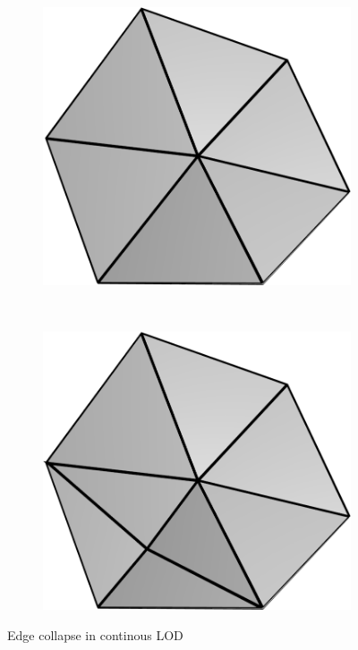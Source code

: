 \begin{figure}
    \centering
    \begin{subfigure}[b]{0.2\textwidth}
        \includegraphics[width=\textwidth]{figures/lod/vertex_split1.png}
    \end{subfigure}
    ~ %
    \begin{subfigure}[b]{0.2\textwidth}
        \includegraphics[width=\textwidth]{figures/lod/vertex_split2.png}
    \end{subfigure}
    \caption{Edge collapse in continous LOD}
    \label{fig:clod}
\end{figure}

